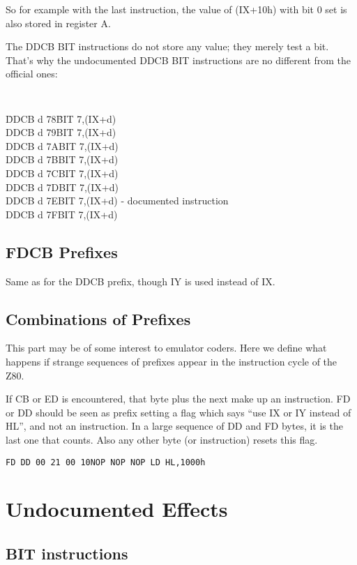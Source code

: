 \documentclass[oneside,a4paper]{book}
\begin{document}
So for example with the last instruction, the value of (IX+10h) with bit 0 set is also stored in register A.

The DDCB BIT instructions do not store any value; they merely test a bit. That's why the undocumented DDCB BIT instructions are no different from the official ones:

{\tt
	\begin{tabbing}
		{\qquad}\=DDCB d 78{\qquad}\=BIT 7,(IX+d)\+\\
		DDCB d 79\>BIT 7,(IX+d)\\
		DDCB d 7A\>BIT 7,(IX+d)\\
		DDCB d 7B\>BIT 7,(IX+d)\\
		DDCB d 7C\>BIT 7,(IX+d)\\
		DDCB d 7D\>BIT 7,(IX+d)\\
		DDCB d 7E\>BIT 7,(IX+d) {\rm - documented instruction}\\
		DDCB d 7F\>BIT 7,(IX+d)
	\end{tabbing}
}


\section{FDCB Prefixes}

Same as for the DDCB prefix, though IY is used instead of IX.


\section{Combinations of Prefixes}

This part may be of some interest to emulator coders. Here we define what happens if strange sequences of prefixes appear in the instruction cycle of the Z80.

If CB or ED is encountered, that byte plus the next make up an instruction. FD or DD should be seen as prefix setting a flag which says ``use IX or IY instead of HL'', and not an instruction. In a large sequence of DD and FD bytes, it is the last one that counts. Also any other byte (or instruction) resets this flag.

{\tt {\qquad}FD DD 00 21 00 10{\qquad}NOP NOP NOP LD HL,1000h}




\chapter{Undocumented Effects}

\section{BIT instructions}
\label{bit_flags}
\end{document}
